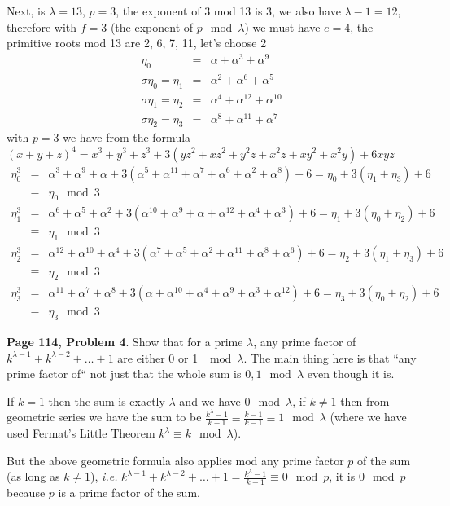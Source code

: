 \documentclass[aps,preprint,preprintnumbers,nofootinbib,showpacs,prd]{revtex4-1}
\newcommand{\ie}{{\it i.e.} }
\newcommand{\nbea}{\begin{eqnarray*}}
\newcommand{\neea}{\end{eqnarray*}}
\begin{document}
Next, is $\lambda=13$, $p=3$, the exponent of 3 mod 13 is 3, we also have $\lambda - 1 = 12$, therefore with $f = 3$ (the exponent of $p \mod{\lambda}$) we must have $e = 4$, the primitive roots mod 13 are 2, 6, 7, 11, let's choose 2
%
\nbea
\eta_0 & = & \alpha + \alpha^{3} + \alpha^{9} \\
\sigma\eta_0 = \eta_1 & = & \alpha^2 + \alpha^{6} + \alpha^{5} \\
\sigma\eta_1 = \eta_2 & = & \alpha^4 + \alpha^{12} + \alpha^{10} \\
\sigma\eta_2 = \eta_3 & = & \alpha^{8} + \alpha^{11} + \alpha^{7}
\neea
%
with $p = 3$ we have from the formula $(x + y + z)^4 = x^3+y^3+z^3+3(yz^2+xz^2+y^2z+x^2z+xy^2+x^2y) +6xyz$
%
\nbea
\eta_0^3 & = & \alpha^3 + \alpha^9 + \alpha + 3(\alpha^5 + \alpha^{11} + \alpha^{7} + \alpha^6 + \alpha^2 + \alpha^8) + 6 = \eta_0 + 3(\eta_1 + \eta_3) + 6 \\
& \equiv & \eta_0 \mod{3} \\
\eta_1^3 & = & \alpha^6 + \alpha^5 + \alpha^2 + 3(\alpha^{10} + \alpha^{9} + \alpha + \alpha^{12} + \alpha^{4} + \alpha^{3}) + 6 = \eta_1 + 3(\eta_0 + \eta_2) + 6 \\
& \equiv & \eta_1 \mod{3} \\
\eta_2^3 & = & \alpha^{12} + \alpha^{10} + \alpha^4 + 3(\alpha^{7} + \alpha^{5} + \alpha^{2} + \alpha^{11} + \alpha^{8} + \alpha^{6}) + 6 = \eta_2 + 3(\eta_1 + \eta_3) + 6 \\
& \equiv & \eta_2 \mod{3} \\
\eta_3^3 & = & \alpha^{11} + \alpha^{7} + \alpha^{8} + 3(\alpha + \alpha^{10} + \alpha^{4} + \alpha^{9} + \alpha^{3} + \alpha^{12}) + 6  = \eta_3 + 3(\eta_0 + \eta_2) + 6 \\
& \equiv & \eta_3 \mod{3}
\neea
%

{\bf Page 114, Problem 4}. Show that for a prime $\lambda$, any prime factor of $k^{\lambda - 1} + k^{\lambda - 2} + \dots + 1$ are either 0 or 1 $\mod{\lambda}$. The main thing here is that ``any prime factor of`` not just that the whole sum is $0,1 \mod{\lambda}$ even though it is.

If $k = 1$ then the sum is exactly $\lambda$ and we have $0 \mod{\lambda}$, if $k \neq 1$ then from geometric series we have the sum to be $\frac{k^{\lambda} - 1}{k - 1} \equiv \frac{k - 1}{k - 1} \equiv 1 \mod{\lambda}$ (where we have used Fermat's Little Theorem $k^\lambda \equiv k \mod{\lambda}$).

But the above geometric formula also applies mod any prime factor $p$ of the sum (as long as $k \neq 1$), \ie $k^{\lambda - 1} + k^{\lambda - 2} + \dots + 1 = \frac{k^{\lambda} - 1}{k - 1} \equiv 0 \mod{p}$, it is $0 \mod{p}$ because $p$ is a prime factor of the sum.
\end{document}
